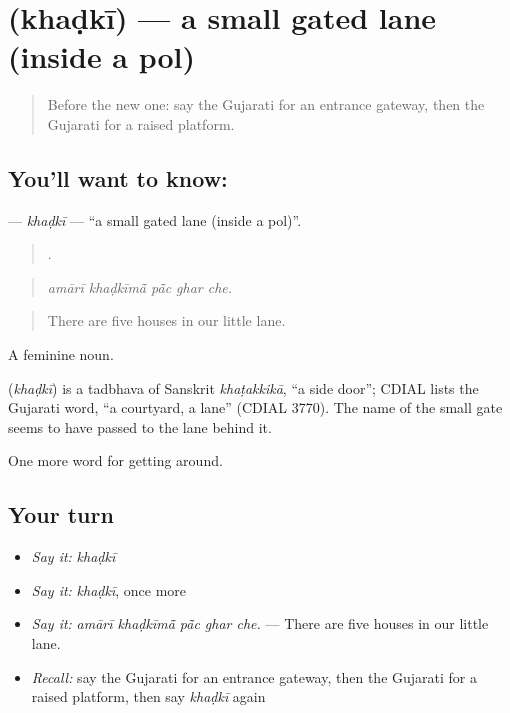 \section[\texorpdfstring{\gu{ખડકી} (khaḍkī)}{ખડકી (khaḍkī)}]{ (khaḍkī) — a small gated lane (inside a pol)}

\label{lesson:GU-C417-khadki}



\begin{quote}
Before the new one: say the Gujarati for an entrance gateway, then the Gujarati for a raised platform.
\end{quote}

\subsection*{You'll want to know: }
\textbf{} — \emph{khaḍkī} — \textquotedblleft{}a small gated lane (inside a pol)\textquotedblright{}.

\begin{quote}
    .
\end{quote}

\begin{quote}
\emph{amārī khaḍkīmā̃ pā̃c ghar che.}
\end{quote}

\begin{quote}
There are five houses in our little lane.
\end{quote}

A feminine noun.

\begin{cousinweb}
\textbf{} (\emph{khaḍkī}) is a tadbhava of Sanskrit \emph{khaṭakkikā}, \textquotedblleft{}a side door\textquotedblright{}; CDIAL lists the Gujarati word, \textquotedblleft{}a courtyard, a lane\textquotedblright{} (CDIAL 3770). The name of the small gate seems to have passed to the lane behind it.
\end{cousinweb}

\begin{grammarlens}[title={What you've built}]
One more word for getting around.
\end{grammarlens}

\subsection*{Your turn}
\begin{itemize}
\raggedright
  \item \emph{Say it:} \emph{khaḍkī}
  \item \emph{Say it:} \emph{khaḍkī}, once more
  \item \emph{Say it:} \emph{amārī khaḍkīmā̃ pā̃c ghar che.} — There are five houses in our little lane.
  \item \emph{Recall:} say the Gujarati for an entrance gateway, then the Gujarati for a raised platform, then say \emph{khaḍkī} again
\end{itemize}

